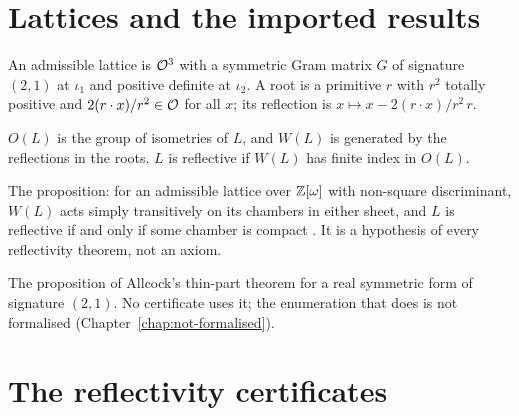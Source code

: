 \chapter{Lattices and the imported results}\label{chap:lattices}

\begin{definition}\label{def:lattice}
\leanok
{}
An admissible lattice is $\mathcal{O}^3$ with a symmetric Gram matrix $G$ of signature $(2,1)$ at
$\iota_1$ and positive definite at $\iota_2$. A root is a primitive $r$ with $r^2$ totally
positive and $2(r\cdot x)/r^2\in\mathcal{O}$ for all $x$; its reflection is
$x\mapsto x-2(r\cdot x)/r^2\,r$.
\end{definition}

\begin{definition}[reflective]\label{def:reflective}
\leanok
{}
$O(L)$ is the group of isometries of $L$, and $W(L)$ is generated by the reflections in the
roots. $L$ is reflective if $W(L)$ has finite index in $O(L)$.
\end{definition}

\begin{definition}\label{def:vinberg}
\leanok
{}
The proposition: for an admissible lattice over $\mathbb{Z}[\omega]$ with non-square discriminant,
$W(L)$ acts simply transitively on its chambers in either sheet, and $L$ is reflective if
and only if some chamber is compact \cite{Vinberg}. It is a hypothesis of every
reflectivity theorem, not an axiom.
\end{definition}

\begin{definition}\label{def:allcock}
\leanok
{}
The proposition of Allcock's thin-part theorem for a real symmetric form of signature
$(2,1)$. No certificate uses it; the enumeration that does is not formalised
(Chapter~\ref{chap:not-formalised}).
\end{definition}

\chapter{The reflectivity certificates}\label{chap:certificates}


